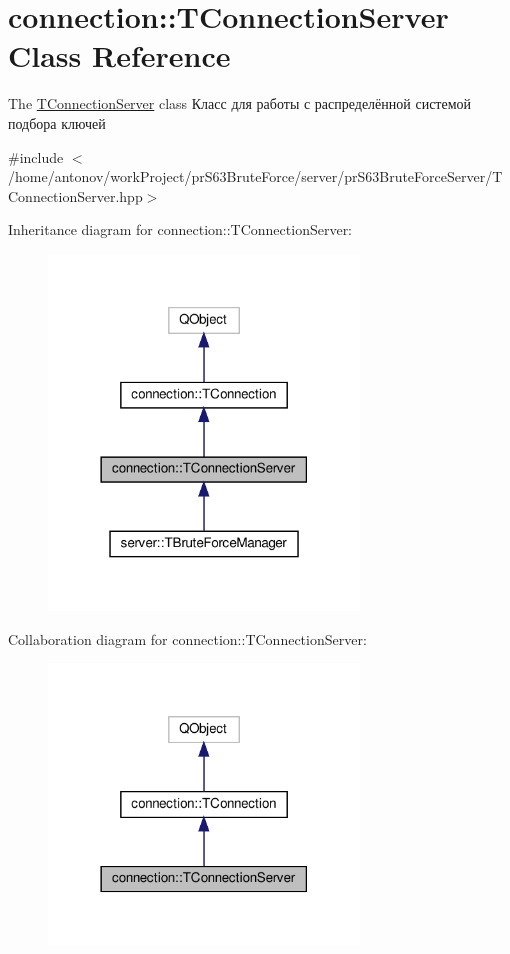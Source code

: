 \hypertarget{classconnection_1_1_t_connection_server}{}\section{connection\+:\+:T\+Connection\+Server Class Reference}
\label{classconnection_1_1_t_connection_server}


The \hyperlink{classconnection_1_1_t_connection_server}{T\+Connection\+Server} class Класс для работы с распределённой системой подбора ключей  




{\ttfamily \#include $<$/home/antonov/work\+Project/pr\+S63\+Brute\+Force/server/pr\+S63\+Brute\+Force\+Server/\+T\+Connection\+Server.\+hpp$>$}



Inheritance diagram for connection\+:\+:T\+Connection\+Server\+:\nopagebreak
\begin{figure}[H]
\begin{center}
\leavevmode
\includegraphics[width=234pt]{classconnection_1_1_t_connection_server__inherit__graph}
\end{center}
\end{figure}


Collaboration diagram for connection\+:\+:T\+Connection\+Server\+:\nopagebreak
\begin{figure}[H]
\begin{center}
\leavevmode
\includegraphics[width=234pt]{classconnection_1_1_t_connection_server__coll__graph}
\end{center}
\end{figure}
